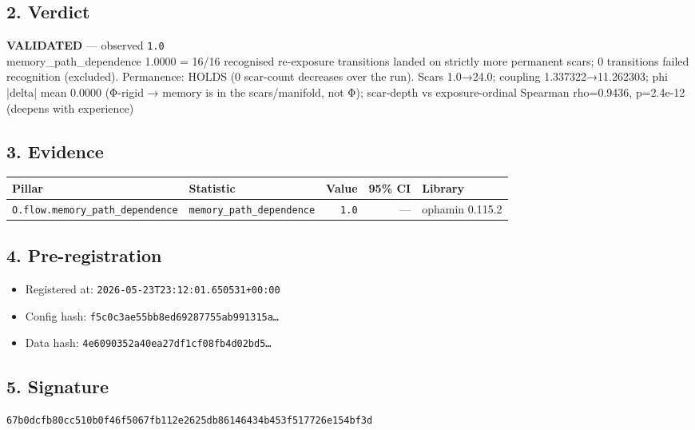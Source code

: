 \documentclass{article}
\begin{document}
\subsection*{2. Verdict}
\textcolor{validated}{\textbf{VALIDATED}} --- observed \texttt{1.0}\\
memory\_path\_dependence 1.0000 = 16/16 recognised re-exposure transitions landed on strictly more permanent scars; 0 transitions failed recognition (excluded). Permanence: HOLDS (0 scar-count decreases over the run). Scars 1.0→24.0; coupling 1.337322→11.262303; phi |delta| mean 0.0000 (Φ-rigid → memory is in the scars/manifold, not Φ); scar-depth vs exposure-ordinal Spearman rho=0.9436, p=2.4e-12 (deepens with experience)
\subsection*{3. Evidence}
\begin{tabular}{llrrl}\toprule
\textbf{Pillar} & \textbf{Statistic} & \textbf{Value} & \textbf{95\% CI} & \textbf{Library} \\\midrule
\texttt{O.flow.memory\_path\_dependence} & \texttt{memory\_path\_dependence} & \texttt{1.0} & --- & ophamin 0.115.2 \\
\bottomrule\end{tabular}
\subsection*{4. Pre-registration}
\begin{itemize}
\item Registered at: \texttt{2026-05-23T23:12:01.650531+00:00}
\item Config hash: \texttt{f5c0c3ae55bb8ed69287755ab991315a\dots}
\item Data hash: \texttt{4e6090352a40ea27df1cf08fb4d02bd5\dots}
\end{itemize}
\subsection*{5. Signature}
\texttt{67b0dcfb80cc510b0f46f5067fb112e2625db86146434b453f517726e154bf3d}\\
\end{document}
